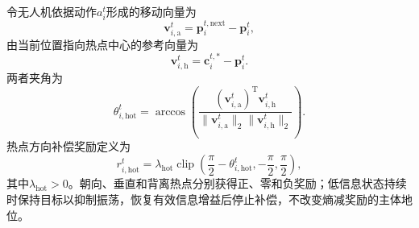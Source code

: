 令无人机依据动作$a_i^t$形成的移动向量为
\begin{equation}
    \boldsymbol v_{i,\mathrm a}^t
    =\boldsymbol p_i^{t,\mathrm{next}}-\boldsymbol p_i^t,
\end{equation}
由当前位置指向热点中心的参考向量为
\begin{equation}
    \boldsymbol v_{i,\mathrm h}^t
    =\boldsymbol c_i^{t,*}-\boldsymbol p_i^t.
\end{equation}
两者夹角为
\begin{equation}
    \theta_{i,\mathrm{hot}}^t
    =
    \arccos
    \left(
    \frac{
    (\boldsymbol v_{i,\mathrm a}^t)^{\mathrm T}
    \boldsymbol v_{i,\mathrm h}^t}
    {
    \|\boldsymbol v_{i,\mathrm a}^t\|_2
    \|\boldsymbol v_{i,\mathrm h}^t\|_2}
    \right).
    \label{eq:rec-hotspot-angle}
\end{equation}
热点方向补偿奖励定义为
\begin{equation}
    r_{i,\mathrm{hot}}^t
    =
    \lambda_{\mathrm{hot}}
    \operatorname{clip}
    \left(
    \frac{\pi}{2}-\theta_{i,\mathrm{hot}}^t,
    -\frac{\pi}{2},
    \frac{\pi}{2}
    \right),
    \label{eq:rec-hotspot-direction-reward}
\end{equation}
其中$\lambda_{\mathrm{hot}}>0$。朝向、垂直和背离热点分别获得正、零和负奖励；低信息状态持续时保持目标以抑制振荡，恢复有效信息增益后停止补偿，不改变熵减奖励的主体地位。



